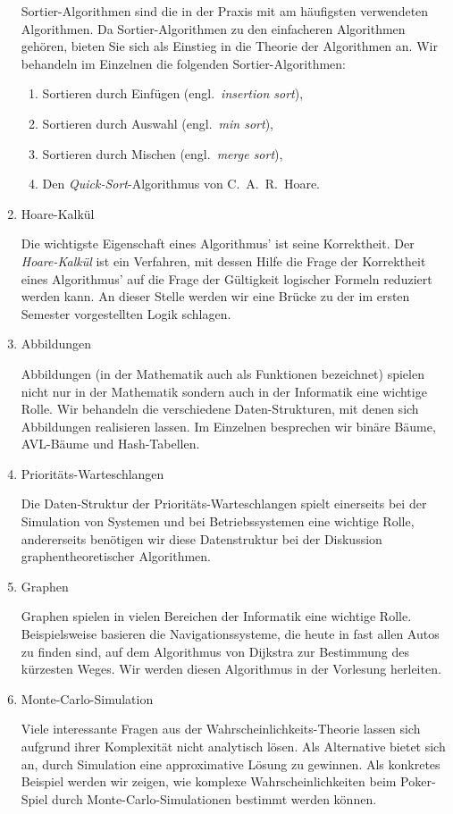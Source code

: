 \begin{enumerate}
      Sortier-Algorithmen sind die in der Praxis mit am h\"aufigsten verwendeten
      Algorithmen.  Da Sortier-Algorithmen zu den einfacheren Algorithmen geh\"oren,
      bieten Sie sich als Einstieg in die Theorie der Algorithmen an.
      Wir behandeln im Einzelnen die folgenden Sortier-Algorithmen:
      \begin{enumerate}
      \item Sortieren durch Einf\"ugen (engl.~\emph{insertion sort}),
      \item Sortieren durch Auswahl (engl.~\emph{min sort}),
      \item Sortieren durch Mischen (engl.~\emph{merge sort}),
      \item Den \emph{Quick-Sort}-Algorithmus von C.~A.~R.~Hoare.
      \end{enumerate}
\item Hoare-Kalk\"ul

      Die wichtigste Eigenschaft eines Algorithmus' ist seine Korrektheit.  Der \emph{Hoare-Kalk\"ul}
      ist ein Verfahren, mit dessen Hilfe die Frage der Korrektheit eines Algorithmus' auf die Frage
      der G\"ultigkeit logischer Formeln reduziert werden kann.  An dieser Stelle werden wir eine
      Br\"ucke zu der im ersten Semester vorgestellten Logik schlagen.
\item Abbildungen
  
      Abbildungen (in der Mathematik auch als Funktionen bezeichnet)
      spielen nicht nur in der Mathematik sondern auch in der Informatik eine wichtige
      Rolle.  Wir behandeln die verschiedene Daten-Strukturen, mit denen sich Abbildungen 
      realisieren lassen.  Im Einzelnen besprechen wir bin\"are B\"aume, AVL-B\"aume und
      Hash-Tabellen.
\item Priorit\"ats-Warteschlangen

      Die Daten-Struktur der Priorit\"ats-Warteschlangen spielt einerseits bei der Simulation von Systemen und
      bei Betriebssystemen eine wichtige Rolle, andererseits  ben\"otigen wir diese Datenstruktur bei der
      Diskussion graphentheoretischer Algorithmen.
\item Graphen
  
      Graphen spielen in vielen Bereichen der Informatik eine wichtige Rolle.
      Beispielsweise basieren die Navigationssysteme, die heute in fast allen Autos zu finden sind,
      auf dem Algorithmus von Dijkstra zur Bestimmung des k\"urzesten Weges.  Wir werden diesen
      Algorithmus in der Vorlesung herleiten.
\item Monte-Carlo-Simulation
  
      Viele interessante Fragen aus der Wahrscheinlichkeits-Theorie lassen sich aufgrund ihrer 
      Komplexit\"at nicht analytisch l\"osen.  Als Alternative bietet sich an, durch Simulation eine 
      approximative L\"osung zu gewinnen.  Als konkretes Beispiel werden wir zeigen, wie
      komplexe Wahrscheinlichkeiten beim Poker-Spiel durch Monte-Carlo-Simulationen bestimmt werden k\"onnen.
\end{enumerate}
